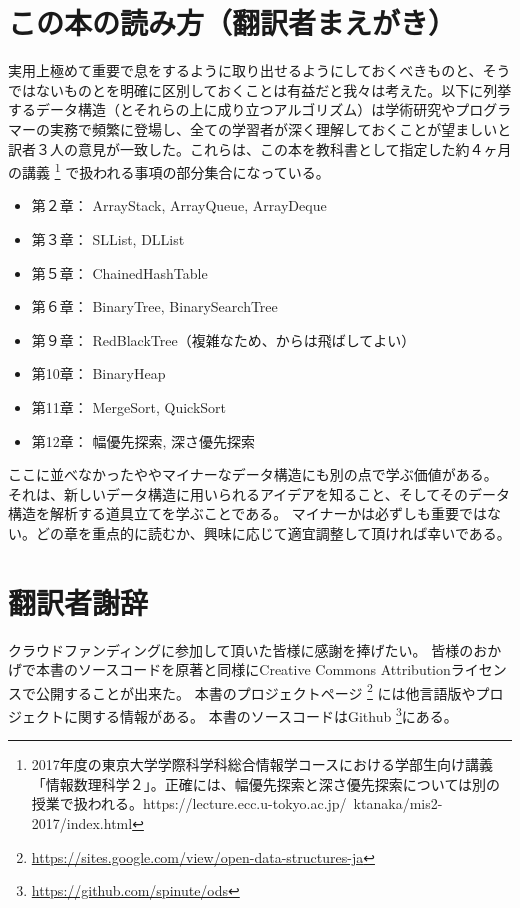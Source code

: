 \chapter*{この本の読み方（翻訳者まえがき）}

実用上極めて重要で息をするように取り出せるようにしておくべきものと、そうではないものとを明確に区別しておくことは有益だと我々は考えた。以下に列挙するデータ構造（とそれらの上に成り立つアルゴリズム）は学術研究やプログラマーの実務で頻繁に登場し、全ての学習者が深く理解しておくことが望ましいと訳者３人の意見が一致した。これらは、この本を教科書として指定した約４ヶ月の講義
\footnote{2017年度の東京大学学際科学科総合情報学コースにおける学部生向け講義「情報数理科学２」。正確には、幅優先探索と深さ優先探索については別の授業で扱われる。https://lecture.ecc.u-tokyo.ac.jp/~ktanaka/mis2-2017/index.html}
で扱われる事項の部分集合になっている。 %


\begin{itemize}
  \item 第２章： ArrayStack, ArrayQueue, ArrayDeque
  \item 第３章： SLList, DLList
  \item 第５章： ChainedHashTable
  \item 第６章： BinaryTree, BinarySearchTree
  \item 第９章： RedBlackTree（複雑なため、からは飛ばしてよい）
  \item 第10章： BinaryHeap
  \item 第11章： MergeSort, QuickSort
  \item 第12章： 幅優先探索, 深さ優先探索
\end{itemize}

ここに並べなかったややマイナーなデータ構造にも別の点で学ぶ価値がある。
それは、新しいデータ構造に用いられるアイデアを知ること、そしてそのデータ構造を解析する道具立てを学ぶことである。
マイナーかは必ずしも重要ではない。どの章を重点的に読むか、興味に応じて適宜調整して頂ければ幸いである。

\chapter*{翻訳者謝辞}
クラウドファンディングに参加して頂いた皆様に感謝を捧げたい。
皆様のおかげで本書のソースコードを原著と同様にCreative Commons Attributionライセンスで公開することが出来た。
本書のプロジェクトページ \footnote {\url{https://sites.google.com/view/open-data-structures-ja}} には他言語版やプロジェクトに関する情報がある。
本書のソースコードはGithub \footnote {\url{https://github.com/spinute/ods}}にある。
